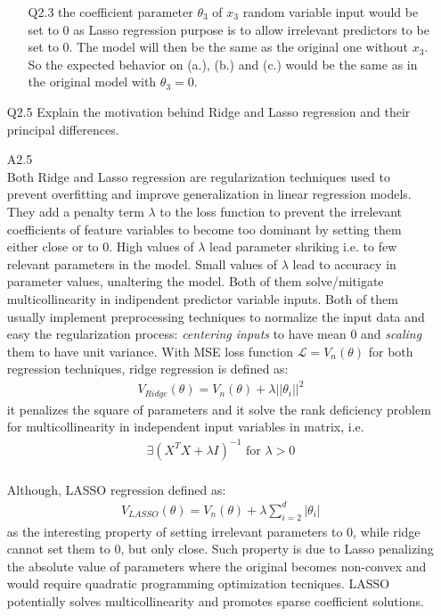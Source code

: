 \documentclass[unicode, 11pt, a4paper]{scrartcl}
\newcommand{\myex}[1]{\begin{equation*}\begin{aligned} #1 \end{aligned}\end{equation*}}
\begin{document}
\begin{itemize}
\begin{itemize}
		      \item[Q2.3] the coefficient parameter $\theta_3$ of $x_3$ random variable input
		            would be set to 0 as Lasso regression purpose is to allow irrelevant predictors
		            to be set to 0.
		            The model will then be the same as the original one without $x_3$.
		            So the expected behavior on (a.), (b.) and (c.)
		            would be the same as in the original model with $\theta_3 = 0$.
	      \end{itemize}

	\item[Q2.5] Explain the motivation behind Ridge and Lasso regression
	      and their principal differences.

	\item[A2.5] ~\\
	      Both Ridge and Lasso regression are regularization techniques
	      used to prevent overfitting and improve generalization in linear regression models.
	      They add a penalty term $\lambda$ to the loss function
	      to prevent the irrelevant coefficients of feature variables to become too dominant
	      by setting them either close or to 0.
	      High values of $\lambda$ lead parameter shriking
	      i.e. to few relevant parameters in the model.
	      Small values of $\lambda$ lead to accuracy in parameter values, unaltering the model.
	      Both of them solve/mitigate multicollinearity in indipendent predictor variable inputs.
	      Both of them usually implement preprocessing techniques to normalize the input data
	      and easy the regularization process:
	      \textit{centering inputs} to have mean 0 and \textit{scaling} them to have unit variance.
	      With MSE loss function $\mathcal{L} = V_n(\theta)$ for both regression techniques,
	      ridge regression is defined as:
	      \myex{
		      V_{Ridge}(\theta) = V_n(\theta) + \lambda || \theta_i ||^2
	      }
	      it penalizes the square of parameters and it solve the rank deficiency problem
	      for multicollinearity in independent input variables in matrix,
	      i.e.
	      \myex{
		      \exists (X^T X + \lambda I)^{-1} \text{ for } \lambda > 0 \\
	      }

	      Although, LASSO regression defined as:
	      \myex{
		      V_{LASSO}(\theta) = V_n(\theta) + \lambda \sum_{i=2}^{d} | \theta_i |
	      }
	      as the interesting property of setting irrelevant parameters to 0,
	      while ridge cannot set them to 0, but only close.
	      Such property is due to Lasso penalizing the absolute value of parameters
	      where the original becomes non-convex and would require quadratic programming
	      optimization tecniques.
	      LASSO potentially solves multicollinearity and promotes sparse coefficient solutions.
\end{itemize}
\end{document}
